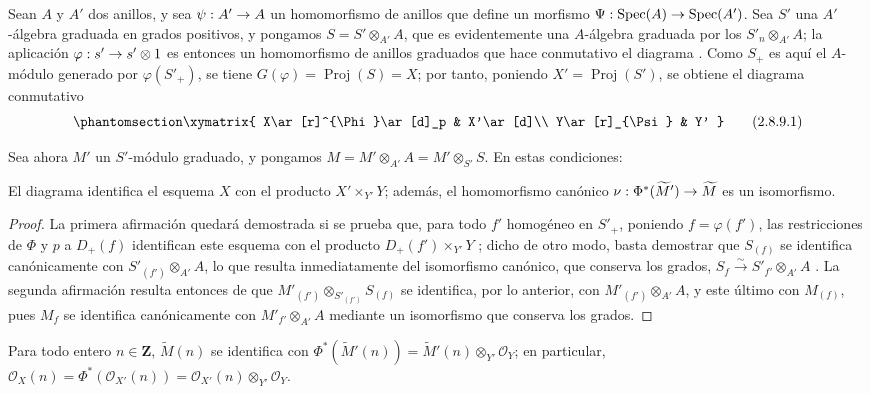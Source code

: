 \documentclass[oneside,10pt]{amsart}
\makeatletter
\newcommand{\ega@arrow}[2]{\mathchoice{#1}{#2}{#2}{#2}}
\renewcommand{\to}{\ega@arrow{\longrightarrow}{\rightarrow}}
\let\EGAOriginalLabel\label
\renewcommand{\label}[1]{\phantomsection\EGAOriginalLabel{#1}}
\makeatother
\begin{document}
\begin{env}[2.8.9]
\label{II.2.8.9-fr}
Sean $A$ y $A'$ dos anillos, y sea $\psi:A'\to A$ un homomorfismo de anillos que define un morfismo $\Psi:\operatorname{Spec}(A)\to\operatorname{Spec}(A')$.
Sea $S'$ una $A'$-álgebra graduada en grados positivos, y pongamos $S=S'\otimes_{A'}A$, que es evidentemente una $A$-álgebra graduada por los $S'_n\otimes_{A'}A$; la aplicación $\varphi:s'\to s'\otimes1$ es entonces un homomorfismo de anillos graduados que hace conmutativo el diagrama .
Como $S_+$ es aquí el $A$-módulo generado por $\varphi(S'_+)$, se tiene $G(\varphi)=\operatorname{Proj}(S)=X$; por tanto, poniendo $X'=\operatorname{Proj}(S')$, se obtiene el diagrama conmutativo
\[
\label{II.2.8.9.1-fr}
  \xymatrix{
    X\ar[r]^{\Phi}\ar[d]_p & X'\ar[d]\\
    Y\ar[r]_{\Psi} & Y'
  }
\tag{2.8.9.1}
\]

Sea ahora $M'$ un $S'$-módulo graduado, y pongamos $M=M'\otimes_{A'}A=M'\otimes_{S'}S$.
En estas condiciones:
\end{env}

\begin{proposition}[2.8.10]
\label{II.2.8.10-fr}
El diagrama  identifica el esquema $X$ con el producto $X'\times_{Y'}Y$; además, el homomorfismo canónico $\nu:\Phi^*(\widetilde{M}')\to\widetilde{M}$  es un isomorfismo.
\end{proposition}

\begin{proof}
La primera afirmación quedará demostrada si se prueba que, para todo $f'$ homogéneo en $S'_+$, poniendo $f=\varphi(f')$, las restricciones de $\Phi$ y $p$ a $D_+(f)$ identifican este esquema con el producto $D_+(f')\times_{Y'}Y$ ; dicho de otro modo, basta  demostrar que $S_{(f)}$ se identifica canónicamente con $S'_{(f')}\otimes_{A'}A$, lo que resulta inmediatamente del isomorfismo canónico, que conserva los grados, $S_f\xrightarrow{\sim}S'_{f'}\otimes_{A'}A$ .
La segunda afirmación resulta entonces de que $M'_{(f')}\otimes_{S'_{(f')}}S_{(f)}$ se identifica, por lo anterior, con $M'_{(f')}\otimes_{A'}A$, y este último con $M_{(f)}$, pues $M_f$ se identifica canónicamente con $M'_{f'}\otimes_{A'}A$ mediante un isomorfismo que conserva los grados.
\end{proof}

\begin{corollary}[2.8.11]
\label{II.2.8.11-fr}
Para todo entero $n\in\mathbf{Z}$, $\widetilde{M}(n)$ se identifica con $\Phi^*(\widetilde{M}'(n))=\widetilde{M}'(n)\otimes_{Y'}\mathcal{O}_Y$; en particular, $\mathcal{O}_X(n)=\Phi^*(\mathcal{O}_{X'}(n))
=\mathcal{O}_{X'}(n)\otimes_{Y'}\mathcal{O}_Y$.
\end{corollary}
\end{document}
